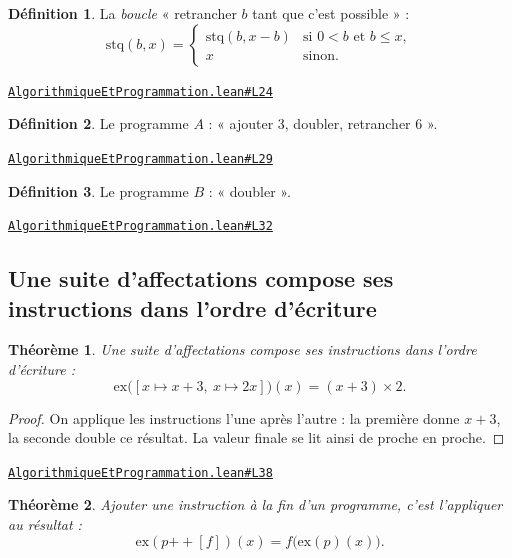 \documentclass[11pt,a4paper]{article}
\theoremstyle{definition}
\newtheorem{definition}{Définition}
\theoremstyle{plain}
\newtheorem{theoreme}{Théorème}
\newcommand{\source}[2]{\par\smallskip\noindent\hfill{\footnotesize\href{#1}{\texttt{#2}}}\par\smallskip}
\begin{document}
\begin{definition}
La \emph{boucle} « retrancher $b$ tant que c'est possible » :
\[ \mathrm{stq}(b, x) =
   \begin{cases}
     \mathrm{stq}(b, x - b) & \text{si } 0 < b \text{ et } b \le x, \\
     x & \text{sinon.}
   \end{cases} \]
\end{definition}
\source{https://github.com/Commutator-IO/learn-lean/blob/main/cours/01-college/07-algorithmique-et-programmation/AlgorithmiqueEtProgrammation.lean\#L24}{AlgorithmiqueEtProgrammation.lean\#L24}

\begin{definition}
Le programme $A$ : « ajouter 3, doubler, retrancher 6 ».
\end{definition}
\source{https://github.com/Commutator-IO/learn-lean/blob/main/cours/01-college/07-algorithmique-et-programmation/AlgorithmiqueEtProgrammation.lean\#L29}{AlgorithmiqueEtProgrammation.lean\#L29}

\begin{definition}
Le programme $B$ : « doubler ».
\end{definition}
\source{https://github.com/Commutator-IO/learn-lean/blob/main/cours/01-college/07-algorithmique-et-programmation/AlgorithmiqueEtProgrammation.lean\#L32}{AlgorithmiqueEtProgrammation.lean\#L32}

\subsection{Une suite d'affectations compose ses instructions dans l'ordre d'écriture}

\begin{theoreme}
Une suite d'affectations compose ses instructions dans l'ordre d'écriture :
\[ \mathrm{ex}\bigl([x \mapsto x+3,\ x \mapsto 2x]\bigr)(x) = (x + 3) \times 2 . \]
\end{theoreme}

\begin{proof}
On applique les instructions l'une après l'autre : la première donne $x + 3$, la seconde
double ce résultat. La valeur finale se lit ainsi de proche en proche.
\end{proof}
\source{https://github.com/Commutator-IO/learn-lean/blob/main/cours/01-college/07-algorithmique-et-programmation/AlgorithmiqueEtProgrammation.lean\#L38}{AlgorithmiqueEtProgrammation.lean\#L38}

\begin{theoreme}
Ajouter une instruction à la fin d'un programme, c'est l'appliquer au résultat :
\[ \mathrm{ex}(p \mathbin{+\!\!+} [f])(x) = f\bigl(\mathrm{ex}(p)(x)\bigr) . \]
\end{theoreme}
\end{document}
